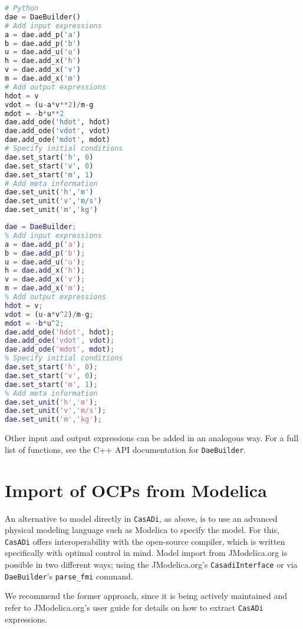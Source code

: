 \documentclass[a4paper,12pt]{book}
\newcommand{\CasADi}{\texttt{CasADi}\xspace}
\newcommand{\python}[1]{\lstinline[language=Python]{#1}}
\begin{document}
\begin{minipage}[t]{0.5\textwidth}
\begin{lstlisting}[language=Python]
# Python
dae = DaeBuilder()
# Add input expressions
a = dae.add_p('a')
b = dae.add_p('b')
u = dae.add_u('u')
h = dae.add_x('h')
v = dae.add_x('v')
m = dae.add_x('m')
# Add output expressions
hdot = v
vdot = (u-a*v**2)/m-g
mdot = -b*u**2
dae.add_ode('hdot', hdot)
dae.add_ode('vdot', vdot)
dae.add_ode('mdot', mdot)
# Specify initial conditions
dae.set_start('h', 0)
dae.set_start('v', 0)
dae.set_start('m', 1)
# Add meta information
dae.set_unit('h','m')
dae.set_unit('v','m/s')
dae.set_unit('m','kg')
\end{lstlisting}
\end{minipage}
\begin{minipage}[t]{0.5\textwidth}
\begin{lstlisting}[language=Matlab]
% MATLAB/Octave
dae = DaeBuilder;
% Add input expressions
a = dae.add_p('a');
b = dae.add_p('b');
u = dae.add_u('u');
h = dae.add_x('h');
v = dae.add_x('v');
m = dae.add_x('m');
% Add output expressions
hdot = v;
vdot = (u-a*v^2)/m-g;
mdot = -b*u^2;
dae.add_ode('hdot', hdot);
dae.add_ode('vdot', vdot);
dae.add_ode('mdot', mdot);
% Specify initial conditions
dae.set_start('h', 0);
dae.set_start('v', 0);
dae.set_start('m', 1);
% Add meta information
dae.set_unit('h','m');
dae.set_unit('v','m/s');
dae.set_unit('m','kg');
\end{lstlisting}
\end{minipage}

Other input and output expressions can be added in an analogous way. For a full
list of functions, see the C++ API documentation for \texttt{DaeBuilder}.

\section{Import of OCPs from Modelica} \label{sec:modelica}
An alternative to model directly in \CasADi, as above, is to use an advanced
physical modeling language such as Modelica to specify the model. For this,
\CasADi offers interoperability with the open-source  compiler, which
is written specifically with optimal control in mind. Model import from
JModelica.org is possible in two different ways; using the JModelica.org's
\texttt{CasadiInterface} or via \texttt{DaeBuilder}'s
\python{parse_fmi} command.

We recommend the former approach, since it is being actively maintained and
refer to JModelica.org's user guide for details on how to extract \CasADi
expressions.
\end{document}
